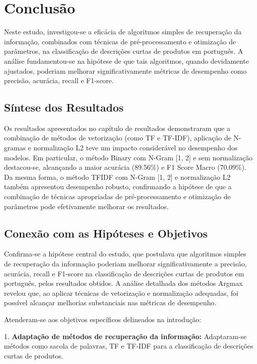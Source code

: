 \chapter{Conclusão}

Neste estudo, investigou-se a eficácia de algoritmos simples de recuperação da informação, combinados com técnicas de pré-processamento e otimização de parâmetros, na classificação de descrições curtas de produtos em português. A análise fundamentou-se na hipótese de que tais algoritmos, quando devidamente ajustados, poderiam melhorar significativamente métricas de desempenho como precisão, acurácia, recall e F1-score.

\section{Síntese dos Resultados}

Os resultados apresentados no capítulo de resultados demonstraram que a combinação de métodos de vetorização (como TF e TF-IDF), aplicação de N-gramas e normalização L2 teve um impacto considerável no desempenho dos modelos. Em particular, o método Binary com N-Gram [1, 2] e sem normalização destacou-se, alcançando a maior acurácia (89.56\%) e F1 Score Macro (70.09\%). Da mesma forma, o método TFIDF com N-Gram [1, 2] e normalização L2 também apresentou desempenho robusto, confirmando a hipótese de que a combinação de técnicas apropriadas de pré-processamento e otimização de parâmetros pode efetivamente melhorar os resultados.

\section{Conexão com as Hipóteses e Objetivos}

Confirma-se a hipótese central do estudo, que postulava que algoritmos simples de recuperação da informação poderiam melhorar significativamente a precisão, acurácia, recall e F1-score na classificação de descrições curtas de produtos em português, pelos resultados obtidos. A análise detalhada dos métodos Argmax revelou que, ao aplicar técnicas de vetorização e normalização adequadas, foi possível alcançar melhorias substanciais nas métricas de desempenho.

Atenderam-se aos objetivos específicos delineados na introdução:

1. \textbf{Adaptação de métodos de recuperação da informação:} Adaptaram-se métodos como sacola de palavras, TF e TF-IDF para a classificação de descrições curtas de produtos.
   
